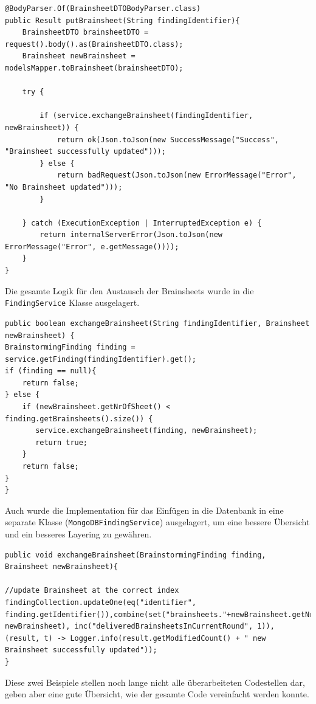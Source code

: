 \begin{lstlisting}[caption={PutBrainsheet nach Refactoring}, label=putBrainsheetNachRef]
@BodyParser.Of(BrainsheetDTOBodyParser.class)
public Result putBrainsheet(String findingIdentifier){
    BrainsheetDTO brainsheetDTO = request().body().as(BrainsheetDTO.class);
    Brainsheet newBrainsheet = modelsMapper.toBrainsheet(brainsheetDTO);

    try {

        if (service.exchangeBrainsheet(findingIdentifier, newBrainsheet)) {
            return ok(Json.toJson(new SuccessMessage("Success", "Brainsheet successfully updated")));
        } else {
            return badRequest(Json.toJson(new ErrorMessage("Error", "No Brainsheet updated")));
        }

    } catch (ExecutionException | InterruptedException e) {
        return internalServerError(Json.toJson(new ErrorMessage("Error", e.getMessage())));
    }
}
\end{lstlisting}

Die gesamte Logik für den Austausch der Brainsheets wurde in die \texttt{FindingService} Klasse ausgelagert.

\begin{lstlisting}[caption={Exchange Brainsheet im Business Layer}, label=exchangeBrainsheetBusinessLayer]
public boolean exchangeBrainsheet(String findingIdentifier, Brainsheet newBrainsheet) {
BrainstormingFinding finding = service.getFinding(findingIdentifier).get();
if (finding == null){
    return false;
} else {
    if (newBrainsheet.getNrOfSheet() < finding.getBrainsheets().size()) {
       service.exchangeBrainsheet(finding, newBrainsheet);
       return true;
    }
    return false;
}
}
\end{lstlisting}

Auch wurde die Implementation für das Einfügen in die Datenbank in eine separate Klasse (\texttt{MongoDBFindingService}) ausgelagert, um eine bessere Übersicht und ein besseres Layering zu gewähren.

\begin{lstlisting}[caption={Exchange Brainsheet im Data Access Layer}, label=exchangeBrainsheetDAL]
public void exchangeBrainsheet(BrainstormingFinding finding, Brainsheet newBrainsheet){
    
//update Brainsheet at the correct index
findingCollection.updateOne(eq("identifier", finding.getIdentifier()),combine(set("brainsheets."+newBrainsheet.getNrOfSheet(), newBrainsheet), inc("deliveredBrainsheetsInCurrentRound", 1)), (result, t) -> Logger.info(result.getModifiedCount() + " new Brainsheet successfully updated"));
}
\end{lstlisting}
Diese zwei Beispiele stellen noch lange nicht alle überarbeiteten Codestellen dar, geben aber eine gute Übersicht, wie der gesamte Code vereinfacht werden konnte.

